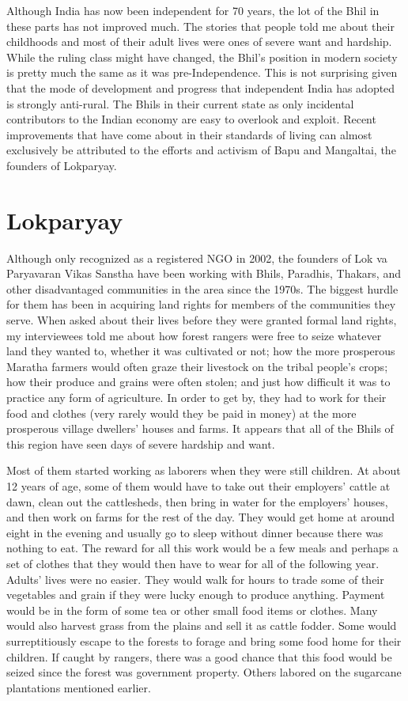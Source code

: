 \documentclass[report.tex]{subfiles}
\begin{document}
Although India has now been independent for 70 years, the lot of the Bhil in these parts has not improved much. The stories that people told me about their childhoods and most of their adult lives were ones of severe want and hardship. While the ruling class might have changed, the Bhil's position in modern society is pretty much the same as it was pre-Independence. This is not surprising given that the mode of development and progress that independent India has adopted is strongly anti-rural. The Bhils in their current state as only incidental contributors to the Indian economy are easy to overlook and exploit. Recent improvements that have come about in their standards of living can almost exclusively be attributed to the efforts and activism of Bapu and Mangaltai, the founders of Lokparyay.

\newpage

\section{Lokparyay}

Although only recognized as a registered NGO in 2002, the founders of Lok va Paryavaran Vikas Sanstha have been working with Bhils, Paradhis, Thakars, and other disadvantaged communities in the area since the 1970s. The biggest hurdle for them has been in acquiring land rights for members of the communities they serve. When asked about their lives before they were granted formal land rights, my interviewees told me about how forest rangers were free to seize whatever land they wanted to, whether it was cultivated or not; how the more prosperous Maratha farmers would often graze their livestock on the tribal people's crops; how their produce and grains were often stolen; and just how difficult it was to practice any form of agriculture. In order to get by, they had to work for their food and clothes (very rarely would they be paid in money) at the more prosperous village dwellers' houses and farms. It appears that all of the Bhils of this region have seen days of severe hardship and want.

Most of them started working as laborers when they were still children. At about 12 years of age, some of them would have to take out their employers' cattle at dawn, clean out the cattlesheds, then bring in water for the employers' houses, and then work on farms for the rest of the day. They would get home at around eight in the evening and usually go to sleep without dinner because there was nothing to eat. The reward for all this work would be a few meals and perhaps a set of clothes that they would then have to wear for all of the following year. Adults' lives were no easier. They would walk for hours to trade some of their vegetables and grain if they were lucky enough to produce anything. Payment would be in the form of some tea or other small food items or clothes. Many would also harvest grass from the plains and sell it as cattle fodder. Some would surreptitiously escape to the forests to forage and bring some food home for their children. If caught by rangers, there was a good chance that this food would be seized since the forest was government property. Others labored on the sugarcane plantations mentioned earlier.
\end{document}
